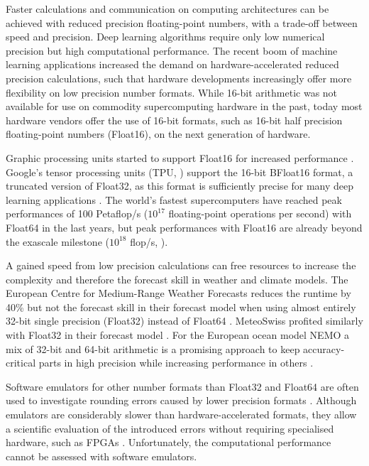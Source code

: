 \documentclass[draft]{agujournal2019}
\begin{document}
Faster calculations and communication on computing architectures can be achieved
with reduced precision floating-point numbers, with a trade-off between speed
and precision. Deep learning algorithms require only low numerical precision but
high computational performance. The recent boom of machine learning applications
increased the demand on hardware-accelerated reduced precision calculations,
such that hardware developments increasingly offer more flexibility on
low precision number formats. While 16-bit arithmetic was not available for use
on commodity supercomputing hardware in the past, today most hardware vendors
offer the use of 16-bit formats, such as 16-bit half precision floating-point
numbers (Float16), on the next generation of hardware.

Graphic processing units started to support Float16 for increased performance
\cite{Markidis2018}. Google's tensor processing units (TPU, )
support the 16-bit BFloat16 format, a truncated version of Float32, as this
format is sufficiently precise for many deep learning applications
\cite{Kalamkar2019,Burgess2019,Gupta2015}. The world's fastest
supercomputers have reached peak performances of 100 Petaflop/s ($10^{17}$
floating-point operations per second) with Float64 in the last years, but peak
performances with Float16 are already beyond the exascale milestone
($10^{18}$ flop/s, ).

A gained speed from low precision calculations can free resources
to increase the complexity and therefore the forecast skill in weather and climate models.
The European Centre for Medium-Range Weather Forecasts reduces the runtime by
40\% but not the forecast skill in their forecast model when using almost entirely
32-bit single precision (Float32) instead of Float64 \cite{Vana2017}. MeteoSwiss
profited similarly with Float32 in their forecast model \cite{Rudisuhli2013}. For
the European ocean model NEMO a mix of 32-bit and 64-bit arithmetic is a promising
approach to keep accuracy-critical parts in high precision while increasing
performance in others \cite{TintoPrims2019}.





Software emulators for other number formats than Float32 and Float64 are often
used to investigate rounding errors caused by lower precision formats \cite{Dawson2017}.
Although emulators are considerably slower than hardware-accelerated formats,
they allow a scientific evaluation of the introduced errors without requiring
specialised hardware, such as FPGAs \cite{Russell2017}. Unfortunately, the
computational performance cannot be assessed with software emulators.
\end{document}
